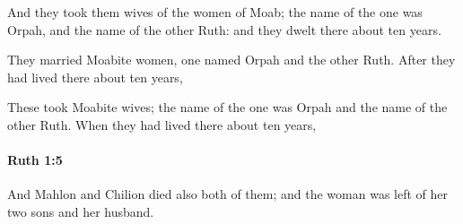 			\begin{versebox}
					\item[BHS] 
					\item[LXX] 
					\item[ASV] And they took them wives of the women of Moab; the name of the one was Orpah, and the name of the other Ruth: and they dwelt there about ten years.
					\item[NIV] They married Moabite women, one named Orpah and the other Ruth. After they had lived there about ten years,
					\item[NRSV] These took Moabite wives; the name of the one was Orpah and the name of the other Ruth. When they had lived there about ten years,
			\end{versebox}

		\paragraph{Ruth 1:5} %
			\label{RUTH-1-5}

			And Mahlon and Chilion died also both of them; and the woman was left of her two sons and her husband.

